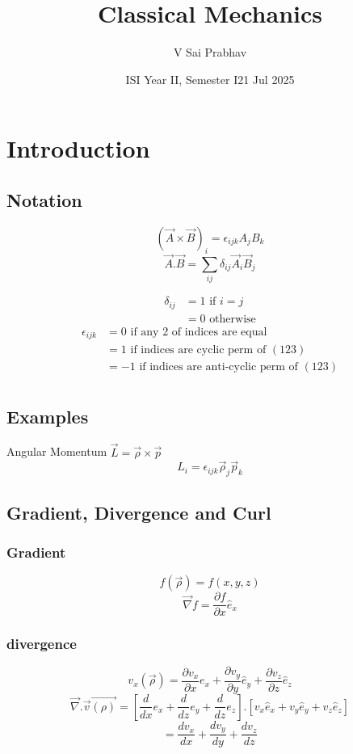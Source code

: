 \documentclass{book}
\title{Classical Mechanics}
\author{V Sai Prabhav}
\date{ISI Year II, Semester I}
\begin{document}
\maketitle

\date{21 Jul 2025}
\chapter{Introduction}
\section{Notation}

\[
  \left(\vec{A} \times  \vec{B}\right)_{i} =\epsilon_{ijk}A_jB_k
\]
\[
  \vec{A}. \vec{B}= \sum_{ij}^{} \delta_{ij} \vec{A}_{i} \vec{B}_{j}
\]

\[
  \begin{aligned}
    \delta_{ij} & = 1 \text{ if } i=j   \\
                & = 0 \text{ otherwise}
  \end{aligned}
\]
\[
  \begin{aligned}
    \epsilon_{ijk} & = 0 \text{ if any 2 of indices are equal}                 \\
                   & = 1 \text{ if indices are cyclic perm of } (1 2 3 )       \\
                   & = -1 \text{ if indices are anti-cyclic perm of } (1 2 3 ) \\
  \end{aligned}
\]


\section{Examples}
Angular Momentum \( \vec{L} = \vec{\rho} \times \vec{p}\)
\[
  L_i = \epsilon_{ijk} \vec{\rho}_{j}\vec{p}_{k}
\]

\section{Gradient, Divergence and Curl}
\subsection{Gradient}
\[
  f(\vec{\rho})= f(x,y,z)
\]
\[
  \vec{\nabla }f= \frac{\partial{f}}{\partial{x}}  \hat{e}_{x}
\]

\subsection{divergence}
$$
  v_x ( \vec{ \rho}  )=\frac{\partial{v_x}}{\partial{x}}e_x+ \frac{\partial{v_y}}{\partial{y}} \hat{e}_{y} + \frac{\partial{v_z}}{\partial{z}} \hat{e}_{z}
$$
\[
  \vec{\nabla }. \vec{v}\vec{(\rho)}= \left[ \frac{d}{dx}e_x + \frac{d}{dz}e_y + \frac{d}{dz}e_z\right] . \left[v_x \hat{e}_x+ v_y \hat{e}_{y} +v_z \hat{e} _{z} \right]
\]
\[
  = \frac{dv_x}{dx}+\frac{dv_y}{dy}+\frac{dv_z}{dz}
\]
\end{document}
